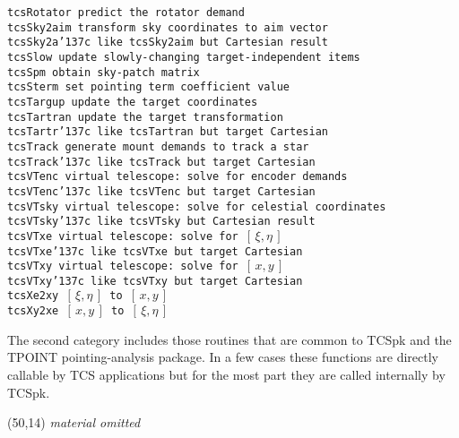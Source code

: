 \documentclass[12pt,fleqn,twoside]{article}
\renewcommand{\_}{{\tt\char'137}}     %
\newcommand{\xieta}     {$[\,\xi,\eta\,]$}
\newcommand{\xy}        {$[\,x,y\,]$}
\newcommand{\abridged}  {\vspace{3ex} \begin{center}
                        \framebox(50,14){\vspace*{1mm}
                        \large \it material omitted}
                        \end{center}\vspace{3ex}}
\begin{document}
\begin{tabbing}
\> \tt tcsRotator  \> predict the rotator demand \\
\> \tt tcsSky2aim  \> transform sky coordinates to aim vector \\
\> \tt tcsSky2a\_c \> like {\tt tcsSky2aim} but Cartesian result \\
\> \tt tcsSlow     \> update slowly-changing target-independent items \\
\> \tt tcsSpm      \> obtain sky-patch matrix \\
\> \tt tcsSterm    \> set pointing term coefficient value \\
\> \tt tcsTargup   \> update the target coordinates \\
\> \tt tcsTartran  \> update the target transformation \\
\> \tt tcsTartr\_c \> like {\tt tcsTartran} but target Cartesian \\
\> \tt tcsTrack    \> generate mount demands to track a star \\
\> \tt tcsTrack\_c \> like {\tt tcsTrack} but target Cartesian \\
\> \tt tcsVTenc    \> virtual telescope: solve for encoder demands \\
\> \tt tcsVTenc\_c \> like {\tt tcsVTenc} but target Cartesian \\
\> \tt tcsVTsky    \> virtual telescope: solve for celestial coordinates \\
\> \tt tcsVTsky\_c \> like {\tt tcsVTsky} but Cartesian result \\
\> \tt tcsVTxe     \> virtual telescope: solve for \xieta \\
\> \tt tcsVTxe\_c  \> like {\tt tcsVTxe} but target Cartesian \\
\> \tt tcsVTxy     \> virtual telescope: solve for \xy \\
\> \tt tcsVTxy\_c  \> like {\tt tcsVTxy} but target Cartesian \\
\> \tt tcsXe2xy    \> \xieta\ to \xy \\
\> \tt tcsXy2xe    \> \xy\ to \xieta
\end{tabbing}
\fi
The second category includes those routines that are common to TCSpk
and the TPOINT pointing-analysis package.  In a few cases these
functions are directly callable by TCS applications but for the most
part they are called internally by TCSpk.
\ifx\vdoc\vshort
\abridged
\else
\end{document}
